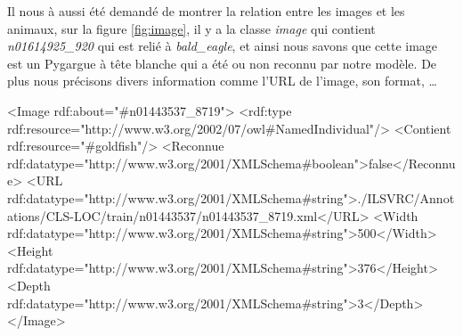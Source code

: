 Il nous à aussi été demandé de montrer la relation entre les images et les animaux, sur la figure \ref{fig:image}, il y a la classe \textit{image} qui contient \textit{n01614925\_920} qui est relié à \textit{bald\_eagle}, et ainsi nous savons que cette image est un Pygargue à tête blanche qui a été ou non reconnu par notre modèle.
De plus nous précisons divers information comme l'URL de l'image, son format, \ldots\

\begin{paddingTab}
    \begin{customFrameXML}
    <Image rdf:about="#n01443537_8719">
      <rdf:type rdf:resource="http://www.w3.org/2002/07/owl#NamedIndividual"/>
      <Contient rdf:resource="#goldfish"/>
      <Reconnue rdf:datatype="http://www.w3.org/2001/XMLSchema#boolean">false</Reconnue>
      <URL rdf:datatype="http://www.w3.org/2001/XMLSchema#string">./ILSVRC/Annotations/CLS-LOC/train/n01443537/n01443537_8719.xml</URL>
      <Width rdf:datatype="http://www.w3.org/2001/XMLSchema#string">500</Width>
      <Height rdf:datatype="http://www.w3.org/2001/XMLSchema#string">376</Height>
      <Depth rdf:datatype="http://www.w3.org/2001/XMLSchema#string">3</Depth>
    </Image>
    \end{customFrameXML}
\end{paddingTab}


